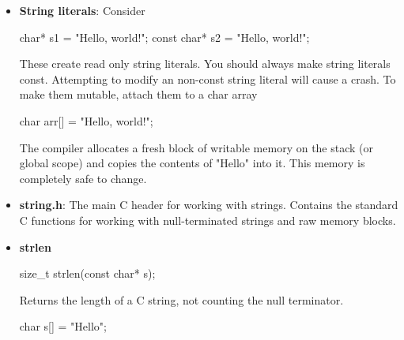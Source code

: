 \documentclass{report}
\begin{document}
    \pagebreak 
    \begin{itemize}
        \item \textbf{String literals}: Consider
            \bigbreak \noindent 
            \begin{cppcode}
            char* s1 = "Hello, world!";
            const char* s2 = "Hello, world!";
            \end{cppcode}
            \bigbreak \noindent 
            These create read only string literals. You should always make string literals const. Attempting to modify an non-const string literal  will cause a crash.
            \bigbreak \noindent 
            To make them mutable, attach them to a char array
            \bigbreak \noindent 
            \begin{cppcode}
                char arr[] = "Hello, world!";
            \end{cppcode}
            \bigbreak \noindent 
            The compiler allocates a fresh block of writable memory on the stack (or global scope) and copies the contents of "Hello" into it. This memory is completely safe to change.


        \item \textbf{string.h}: The main C header for working with strings. Contains the standard C functions for working with null-terminated strings and raw memory blocks.
        \item \textbf{strlen}
            \bigbreak \noindent 
            \begin{cppcode}
                size_t strlen(const char* s);
            \end{cppcode}
            \bigbreak \noindent 
            Returns the length of a C string, not counting the null terminator.
            \bigbreak \noindent 
            \begin{cppcode}
                char s[] = "Hello";


\end{cppcode}
\end{itemize}
\end{document}
